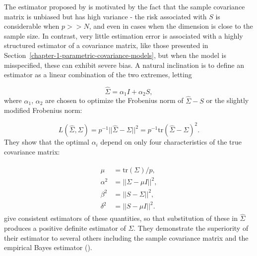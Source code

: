 \bigskip

The estimator proposed by \cite{ledoit2004well} is motivated by the fact that the sample covariance matrix is unbiased but has high variance - the risk associated with $S$ is considerable when $p >> N$, and even in cases when the dimension is close to the sample size. In contrast, very little estimation error is associated with a highly structured estimator of a covariance matrix, like those presented in Section~\ref{chapter-1-parametric-covariance-models}, but when the model is misspecified, these can exhibit severe bias. A natural inclination is to define an estimator as a linear combination of the two extremes, letting

\begin{equation} \label{eq:ledoit-wolf-estimator}
\hat{\Sigma} = \alpha_1 I + \alpha_2 S,
\end{equation}
\noindent
where $\alpha_1$, $\alpha_2$ are chosen to optimize the Frobenius norm of $\hat{\Sigma} - S$ or the slightly modified Frobenius norm:

\[
L\left(\hat{\Sigma},\Sigma\right) = p^{-1} \vert \vert\hat{\Sigma}-\Sigma   \vert \vert^2 = p^{-1} \mbox{tr}\left(\hat{\Sigma}-\Sigma \right)^2.
\] 
\noindent
They show that the optimal $\alpha_i$ depend on only four characteristics of the true covariance matrix:

\begin{align}
\begin{split}
\mu &= \mbox{tr}\left(\Sigma\right)/p, \\
\alpha^2 &= \vert\vert \Sigma - \mu I\vert\vert^2, \\
\beta^2 &= \vert\vert S - \Sigma  \vert\vert^2, \\
\delta^2 &= \vert\vert S - \mu I\vert\vert^2.
\end{split}
\end{align}
\noindent
\cite{ledoit2004well} give consistent estimators of these quantities, so that substitution of these in $\hat{\Sigma}$ produces a positive definite estimator of $\Sigma$. They demonstrate the superiority of their estimator to several others including the sample covariance matrix and the empirical Bayes estimator (\cite{haff1980empirical}).


\bigskip


